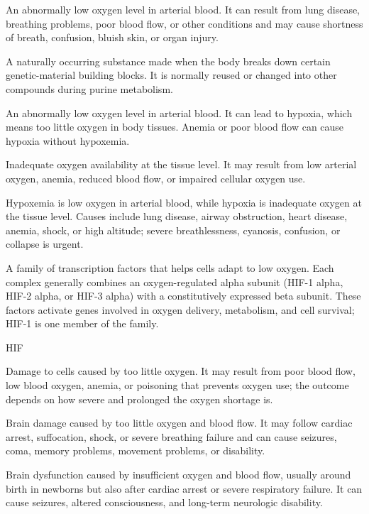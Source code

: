  An abnormally low oxygen level in arterial blood. It can result from lung disease, breathing problems, poor blood flow, or other conditions and may cause shortness of breath, confusion, bluish skin, or organ injury.

 A naturally occurring substance made when the body breaks down certain genetic-material building blocks. It is normally reused or changed into other compounds during purine metabolism.

 An abnormally low oxygen level in arterial blood. It can lead to hypoxia, which means too little oxygen in body tissues. Anemia or poor blood flow can cause hypoxia without hypoxemia.

 Inadequate oxygen availability at the tissue level. It may result from low arterial oxygen, anemia,
reduced blood flow, or impaired cellular oxygen use.

 Hypoxemia is low oxygen in arterial blood, while hypoxia is inadequate oxygen at the tissue level. Causes include lung disease, airway obstruction, heart disease, anemia, shock, or high altitude; severe breathlessness, cyanosis, confusion, or collapse is urgent.

 A family of transcription factors that helps cells adapt to low oxygen. Each complex generally combines an oxygen-regulated alpha subunit (HIF-1 alpha, HIF-2 alpha, or HIF-3 alpha) with a constitutively expressed beta subunit. These factors activate genes involved in oxygen delivery, metabolism, and cell survival; HIF-1 is one member of the family.

\synonyms
HIF

 Damage to cells caused by too little oxygen. It may result from poor blood flow, low blood oxygen, anemia, or poisoning that prevents oxygen use; the outcome depends on how severe and prolonged the oxygen shortage is.

 Brain damage caused by too little oxygen and blood flow. It may follow cardiac arrest, suffocation, shock, or severe breathing failure and can cause seizures, coma, memory problems, movement problems, or disability.

 Brain dysfunction caused by insufficient oxygen and blood flow, usually around birth in newborns but also after cardiac arrest or severe respiratory failure. It can cause seizures, altered consciousness, and long-term neurologic disability.

